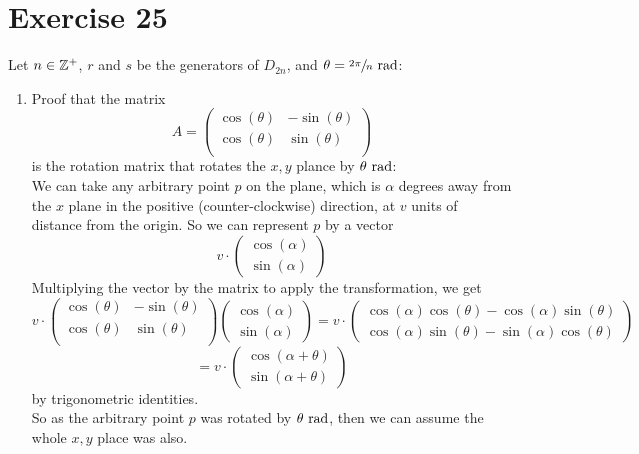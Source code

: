 \documentclass[12pt]{article}
\begin{document}
    \section*{Exercise 25}
    Let $n \in \mathbb{Z}^+$, $r$ and $s$ be the generators of $D_{2n}$,
    and $\theta = \sfrac{2 \pi}{n} \text{ rad}$: \\
    \begin{enumerate}[label=\textbf{\alph*.}]
        \item 
            Proof that the matrix
            \[ A  = \begin{pmatrix}
                \cos(\theta) & -\sin(\theta) \\
                \cos(\theta) & \sin(\theta) \\
            \end{pmatrix} \]
            is the rotation matrix that rotates the $x, y$ plance
            by $\theta \text{ rad}$: \\
            We can take any arbitrary point $p$ on the plane,
            which is $\alpha$ degrees away from the $x$ plane in the positive
            (counter-clockwise) direction,
            at $v$ units of distance from the origin.
            So we can represent $p$ by a vector
            \[v \cdot \begin{pmatrix}
                \cos(\alpha) \\
                \sin(\alpha)
            \end{pmatrix} \]
            Multiplying the vector by the matrix to apply the transformation,
            we get
            \[ v \cdot \begin{pmatrix}
                \cos(\theta) & -\sin(\theta) \\
                \cos(\theta) & \sin(\theta) \\
            \end{pmatrix}
            \begin{pmatrix}
                \cos(\alpha) \\
                \sin(\alpha)
            \end{pmatrix} 
            = v \cdot \begin{pmatrix}
                \cos(\alpha)\cos(\theta) - \cos(\alpha)\sin(\theta) \\
                \cos(\alpha)\sin(\theta) - \sin(\alpha)\cos(\theta)
            \end{pmatrix} \]
            \[ = v \cdot \begin{pmatrix}
                \cos(\alpha + \theta) \\
                \sin(\alpha + \theta)
            \end{pmatrix} \]
            by trigonometric identities. \\
            So as the arbitrary point $p$ was rotated by $\theta \text{ rad}$,
            then we can assume the whole $x, y$ place was also.
            

\end{enumerate}
\end{document}
